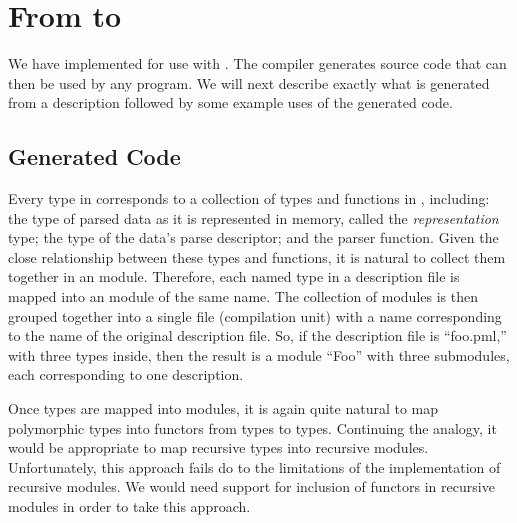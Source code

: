 
\section{From \padsmlbig{} to \ocaml{}}
\label{sec:padsml-impl}

We have implemented \padsml{} for use with \ocaml{}. The \padsml{}
compiler generates \ocaml{} source code that can then be used by any
\ocaml{} program. We will next describe exactly what is generated from
a description followed by some example uses of the generated code.

\subsection{Generated Code}
\label{sec:gen-code}

Every type in \padsml{} corresponds to a collection of types and
functions in \ocaml{}, including: the type of parsed data as it is represented in
memory, called the \textit{representation} type; the type of the data's
parse descriptor; and the parser function. Given the close relationship
between these types and functions, it is natural to collect them
together in an \ocaml{} module. Therefore, each named type in a
description file is mapped into an \ocaml module of the same
name. The collection of modules is then grouped together into a single
file (compilation unit) with a name corresponding to the name of the
original description file. So, if the description file is ``foo.pml,''
with three types inside, then the result is a module ``Foo'' with
three submodules, each corresponding to one description.

Once types are mapped into modules, it is again quite
natural to map polymorphic types into functors from types to
types. Continuing the analogy, it would be appropriate to map
recursive types into recursive modules. Unfortunately, this approach
fails do to the limitations of the \ocaml{} implementation of
recursive modules. We would need support for inclusion of functors in
recursive modules in order to take this approach.

